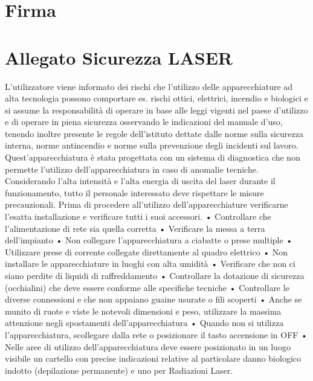 \documentclass[10pt]{article}
\begin{document}
\section{Firma}
\section{Allegato Sicurezza LASER}
L'utilizzatore viene informato dei rischi che l'utilizzo delle apparecchiature ad alta tecnologia possono comportare es. rischi ottici, elettrici, incendio e biologici e si assume la responsabilità di operare in base alle leggi vigenti nel paese d'utilizzo e di operare in piena sicurezza osservando le indicazioni del manuale d'uso, tenendo inoltre presente le regole dell'istituto dettate dalle norme sulla sicurezza interna, norme antincendio e norme sulla prevenzione degli incidenti sul lavoro. Quest'apparecchiatura è stata progettata con un sistema di diagnostica che non permette l'utilizzo dell'apparecchiatura in caso di anomalie tecniche. Considerando l'alta intensità e l'alta energia di uscita del laser durante il funzionamento, tutto il personale interessato deve rispettare le misure precauzionali. Prima di procedere all'utilizzo dell'apparecchiature verificarne l'esatta installazione e verificare tutti i suoi accessori. • Controllare che l'alimentazione di rete sia quella corretta • Verificare la messa a terra dell'impianto • Non collegare l'apparecchiatura a ciabatte o prese multiple • Utilizzare prese di corrente collegate direttamente al quadro elettrico • Non installare le apparecchiature in luoghi con alta umidità • Verificare che non ci siano perdite di liquidi di raffreddamento • Controllare la dotazione di sicurezza (occhialini) che deve essere conforme alle specifiche tecniche • Controllare le diverse connessioni e che non appaiano guaine usurate o fili scoperti • Anche se munito di ruote e viste le notevoli dimensioni e peso, utilizzare la massima attenzione negli spostamenti dell'apparecchiatura • Quando non si utilizza l'apparecchiatura, scollegare dalla rete o posizionare il tasto accensione in OFF • Nelle aree di utilizzo dell'apparecchiatura deve essere posizionato in un luogo visibile un cartello con precise indicazioni relative al particolare danno biologico indotto (depilazione permanente) e uno per Radiazioni Laser.
\end{document}
